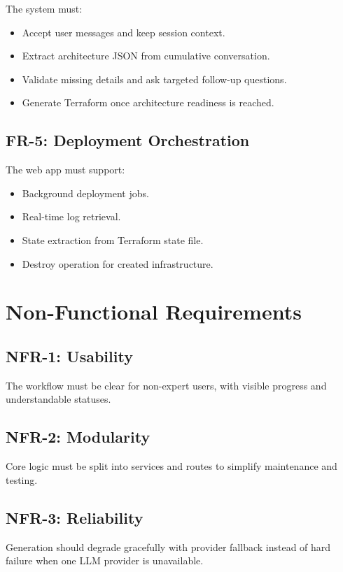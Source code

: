 \documentclass[12pt,a4paper,openany]{report}
\begin{document}
The system must:
\begin{itemize}
    \item Accept user messages and keep session context.
    \item Extract architecture JSON from cumulative conversation.
    \item Validate missing details and ask targeted follow-up questions.
    \item Generate Terraform once architecture readiness is reached.
\end{itemize}

\subsection{FR-5: Deployment Orchestration}

The web app must support:
\begin{itemize}
    \item Background deployment jobs.
    \item Real-time log retrieval.
    \item State extraction from Terraform state file.
    \item Destroy operation for created infrastructure.
\end{itemize}

\section{Non-Functional Requirements}

\subsection{NFR-1: Usability}

The workflow must be clear for non-expert users, with visible progress and understandable statuses.

\subsection{NFR-2: Modularity}

Core logic must be split into services and routes to simplify maintenance and testing.

\subsection{NFR-3: Reliability}

Generation should degrade gracefully with provider fallback instead of hard failure when one LLM provider is unavailable.
\end{document}
